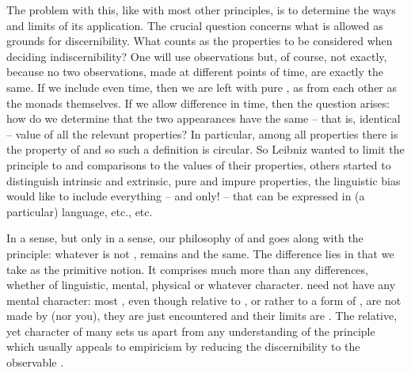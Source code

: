 The problem with this, like with most other principles, is to determine the ways
and limits of its application. The crucial question concerns what is allowed as
grounds for 
discernibility.  What counts as the properties to be considered when deciding
indiscernibility?  One will use  observations but, of course, not
exactly, because no two observations, made at different points of time, are
exactly the same.  If we include even time, then we are left with pure
, as  from each other as the monads themselves.
If we allow difference in time, then the question arises: how do we
determine that the two appearances have the same -- that is, identical -- value
of all the relevant properties?  In particular, among all properties there is
the property of  and so such a definition is
circular. So Leibniz wanted to limit the principle to  and
comparisons to the values of their properties, others started to distinguish
intrinsic and extrinsic, pure and impure properties, the linguistic bias would
like to include everything -- and only! -- that can be expressed in (a
particular) language, etc., etc.

In a sense, but only in a sense, our philosophy of  and
 goes along with the principle: whatever is not
, remains  and the same.  The difference lies in that
we take  as the primitive notion. It comprises much more than
any  differences, whether of linguistic, mental, physical or whatever
character.   need not have any mental character: most
, even though relative to , or rather to a form of
, are not made by  (nor you), they are just encountered and
their limits are . The relative, yet 
character of many  sets us apart from any understanding of the
principle which usually appeals to empiricism by reducing the discernibility to
the  observable .


